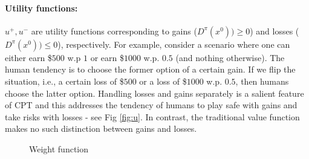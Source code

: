 \documentclass[11pt,letterpaper,english]{article}
\begin{document}
\paragraph{Utility functions:} $u^+, u^-$ are utility functions corresponding to gains ($D^\pi(x^0)) \ge 0$) and losses ($D^\pi(x^0)) \le 0$), respectively. For example, consider a scenario where one can either earn \$$500$ w.p $1$ or earn \$$1000$ w.p. $0.5$ (and nothing otherwise). The human tendency is to choose the former option of a certain gain. If we flip the situation, i.e., a certain loss of \$$500$ or a loss of \$$1000$ w.p. $0.5$, then humans choose the latter option.  Handling losses and gains separately is a salient feature of CPT and this addresses the tendency of humans to play safe with gains and take risks with losses - see Fig \ref{fig:u}.  In contrast, the traditional value function makes no such distinction between gains and losses.  

\begin{figure}[h]
\centering
{}
\caption{Weight function}
\label{fig:w}
\end{figure}
\end{document}
